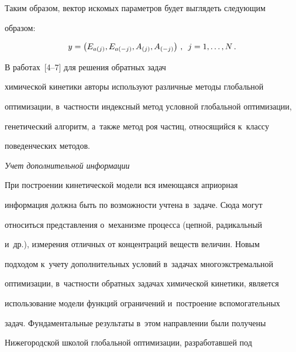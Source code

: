   


  Таким образом, вектор искомых параметров будет выглядеть следующим 


образом:


  \begin{equation*}


  y=\left( E_{a{(j)}}, E_{a{(-j)}}, A_{(j)}, A_{(-j)}\right) \,,\enskip j=1,\ldots , N\,.




  \end{equation*}


    


  В работах~[4--7] для решения обратных задач 


химической кинетики авторы используют различные методы глобальной 


оптимизации, в~част\-ности индексный метод условной глобальной оптимизации, 


генетический алгоритм, а~также метод роя частиц, относящийся к~классу 


поведенческих методов.


  


  \medskip


  


  \textit{Учет дополнительной информации}


  \medskip


  


  При построении кинетической модели вся имеющаяся априорная 


информация должна быть по возможности учтена в~задаче. Сюда могут 


относиться пред\-став\-ле\-ния о~механизме процесса (цепной, радикальный 


и~др.), измерения отличных от концентраций веществ величин. Новым 


подходом к~учету дополнительных условий в~задачах многоэкстремальной 


оптимизации, в~частности обратных задачах химической кинетики, является 


использование модели функций ограничений и~построение вспомогательных 


задач. Фундаментальные результаты в~этом направлении были получены 


Нижегородской школой глобальной оптимизации, разработавшей под 


